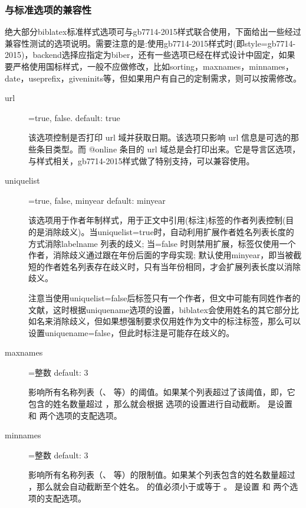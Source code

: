\subsubsection{与标准选项的兼容性}
绝大部分biblatex标准样式选项可与gb7714-2015样式联合使用，下面给出一些经过兼容性测试的选项说明。需要注意的是:使用gb7714-2015样式时(即style=gb7714-2015)，backend选择应指定为biber，还有一些选项已经在样式设计中固定，如果要严格使用国标样式，一般不应做修改，比如sorting，maxnames，minnames，date，useprefix，giveninits等，但如果用户有自己的定制需求，则可以按需修改。

\begin{description}
  \item[url]=true, false. \hfill default: true

  该选项控制是否打印 url 域并获取日期。该选项只影响 url 信息是可选的那些条目类型。而 @online 条目的 url 域总是会打印出来。它是导言区选项，与样式相关，gb7714-2015样式做了特别支持，可以兼容使用。

  \item[uniquelist]=true, false, minyear \hfill default: minyear

  该选项用于作者年制样式，用于正文中引用(标注)标签的作者列表控制(目的是消除歧义)。当uniquelist=true时，自动利用扩展作者姓名列表长度的方式消除labelname 列表的歧义; 当=false 时则禁用扩展，标签仅使用一个作者，消除歧义通过跟在年份后面的字母实现; 默认使用minyear，即当被截短的作者姓名列表存在歧义时，只有当年份相同，才会扩展列表长度以消除歧义。

  注意当使用uniquelist=false后标签只有一个作者，但文中可能有同姓作者的文献，这时根据uniquename选项的设置，biblatex会使用姓名的其它部分比如名来消除歧义，但如果想强制要求仅用姓作为文中的标注标签，那么可以设置uniquename=false，但此时标注是可能存在歧义的。

  \item[maxnames]=整数 \hfill default: 3

  影响所有名称列表（、 等）的阈值。如果某个列表超过了该阈值，即，它包含的姓名数量超过 ，那么就会根据  选项的设置进行自动截断。 是设置  和  两个选项的支配选项。

  \item[minnames]=整数 \hfill default: 3

  影响所有名称列表（、 等）的限制值。如果某个列表包含的姓名数量超过 ，那么就会自动截断至个姓名。 的值必须小于或等于 。 是设置  和  两个选项的支配选项。


\end{description}
